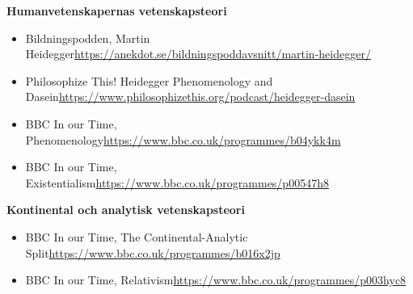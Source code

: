 \documentclass[11pt,a4paper]{report}
\begin{document}
\textbf{Humanvetenskapernas vetenskapsteori}

\begin{itemize}
\item Bildningspodden, Martin Heidegger\newline \href{https://anekdot.se/bildningspoddavsnitt/martin-heidegger/}{https://anekdot.se/bildningspoddavsnitt/martin-heidegger/}

\item Philosophize This! Heidegger Phenomenology and Dasein\newline \href{https://www.philosophizethis.org/podcast/heidegger-dasein}{https://www.philosophizethis.org/podcast/heidegger-dasein}

\item BBC In our Time, Phenomenology\newline \href{https://www.bbc.co.uk/programmes/b04ykk4m}{https://www.bbc.co.uk/programmes/b04ykk4m}

\item BBC In our Time, Existentialism\newline \href{https://www.bbc.co.uk/programmes/p00547h8}{https://www.bbc.co.uk/programmes/p00547h8}

\end{itemize}



\textbf{Kontinental och analytisk vetenskapsteori}

\begin{itemize}
\item BBC In our Time, The Continental-Analytic Split\newline \href{https://www.bbc.co.uk/programmes/b016x2jp}{https://www.bbc.co.uk/programmes/b016x2jp}

\item BBC In our Time, Relativism\newline \href{https://www.bbc.co.uk/programmes/p003hyc8}{https://www.bbc.co.uk/programmes/p003hyc8}


\end{itemize}
\end{document}
